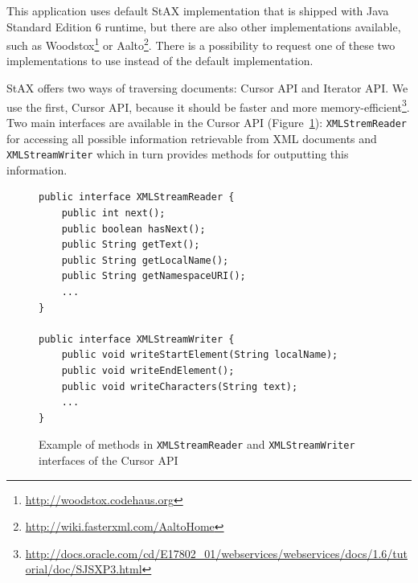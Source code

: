 \documentclass[11pt,oneside,final]{fithesis2}
\begin{document}
This application uses default StAX implementation that is shipped with Java Standard Edition 6 runtime, but there are also other implementations available, such as Woodstox\footnote{\url{http://woodstox.codehaus.org}} or Aalto\footnote{\url{http://wiki.fasterxml.com/AaltoHome}}. There is a possibility to request one of these two implementations to use instead of the default implementation.

StAX offers two ways of traversing documents: Cursor API and Iterator API. We use the first, Cursor API, because it should be faster and more memory-efficient\footnote{\url{http://docs.oracle.com/cd/E17802_01/webservices/webservices/docs/1.6/tutorial/doc/SJSXP3.html}}. Two main interfaces are available in the Cursor API (Figure~\ref{fig:staxcursorapi}): \texttt{XMLStremReader} for accessing all possible information retrievable from XML documents and \texttt{XMLStreamWriter} which in turn provides methods for outputting this information. 

\begin{figure}[!ht]
\begin{lstlisting}
public interface XMLStreamReader {
	public int next();
   	public boolean hasNext();
   	public String getText();		
  	public String getLocalName();
  	public String getNamespaceURI();
  	...
} 

public interface XMLStreamWriter {
  	public void writeStartElement(String localName);
  	public void writeEndElement();
 	public void writeCharacters(String text);
	... 
}
\end{lstlisting}
\caption{Example of methods in \texttt{XMLStreamReader} and \texttt{XMLStreamWriter} interfaces of the Cursor API}
\label{fig:staxcursorapi}
\end{figure}
\end{document}
